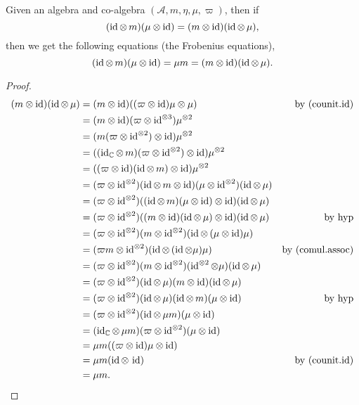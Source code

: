  \begin{theorem}\label{Frobenius_equations}\leanok
  Given an algebra and co-algebra $(\mathcal{A},m,\eta,\mu,\varpi)$, then if
  \[(\id\otimes\,m)(\mu\otimes\id)=(m\otimes\id)(\id\otimes\,\mu),\]
  then we get the following equations (the Frobenius equations),
  \[(\id\otimes\,m)(\mu\otimes\id)=\mu m=(m\otimes\id)(\id\otimes\,\mu).\]
 \end{theorem}
 \begin{proof}\leanok
  \begin{align*}
   (m\otimes\id)(\id\otimes\,\mu) &= (m\otimes\id)((\varpi\otimes\id)\mu\otimes\mu) &\text{by (counit.id)}\\
   &= (m\otimes\id)(\varpi\otimes\id^{\otimes3})\mu^{\otimes2}\\
   &= (m(\varpi\otimes\id^{\otimes2})\otimes\id)\mu^{\otimes2}\\
   &= ((\id_\CC\otimes\,m)(\varpi\otimes\id^{\otimes2})\otimes\id)\mu^{\otimes2}\\
   &= ((\varpi\otimes\id)(\id\otimes\,m)\otimes\id)\mu^{\otimes2}\\
   &= (\varpi\otimes\id^{\otimes2})(\id\otimes\,m\otimes\id)(\mu\otimes\id^{\otimes2})(\id\otimes\,\mu)\\
   &= (\varpi\otimes\id^{\otimes2})((\id\otimes\,m)(\mu\otimes\id)\otimes\id)(\id\otimes\,\mu)\\
   &= (\varpi\otimes\id^{\otimes2})((m\otimes\id)(\id\otimes\,\mu)\otimes\id)(\id\otimes\,\mu) &\text{by hyp}\\
   &= (\varpi\otimes\id^{\otimes2})(m\otimes\id^{\otimes2})(\id\otimes\,(\mu\otimes\id)\mu)\\
   &= (\varpi m\otimes\id^{\otimes2})(\id\otimes\,(\id\otimes\mu)\mu) &\text{by (comul.assoc)}\\
   &= (\varpi\otimes\id^{\otimes2})(m\otimes\id^{\otimes2})(\id^{\otimes2}\otimes\mu)(\id\otimes\,\mu)\\
   &= (\varpi\otimes\id^{\otimes2})(\id\otimes\,\mu)(m\otimes\id)(\id\otimes\,\mu)\\
   &= (\varpi\otimes\id^{\otimes2})(\id\otimes\,\mu)(\id\otimes\,m)(\mu\otimes\id) &\text{by hyp}\\
   &= (\varpi\otimes\id^{\otimes2})(\id\otimes\,\mu m)(\mu\otimes\id)\\
   &= (\id_\CC\otimes\,\mu m)(\varpi\otimes\id^{\otimes2})(\mu\otimes\id)\\
   &= \mu m((\varpi\otimes\id)\mu\otimes\id)\\
   &= \mu m(\id\otimes\,\id) &\text{by (counit.id)}\\
   &= \mu m.
  \end{align*}
 \end{proof}

